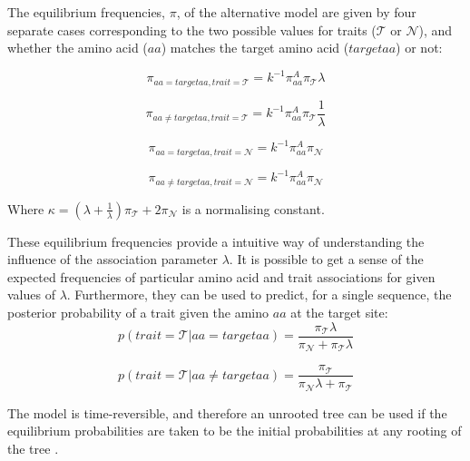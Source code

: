 \documentclass[]{article}
\begin{document}
The equilibrium frequencies, $\pi$, of the alternative model are given by four separate cases corresponding to the two possible values for traits ($\mathcal{T}$ or $\mathcal{N}$), and whether the amino acid ($aa$) matches the target amino acid ($targetaa$) or not:

\begin{equation}
\pi_{aa=targetaa,trait=\mathcal{T}}=k^{-1}\pi_{aa}^{A}\pi_{\mathcal{T}}\lambda
\end{equation}

\begin{equation}
\pi_{aa\neq targetaa,trait=\mathcal{T}}=k^{-1}\pi_{aa}^{A}\pi_{\mathcal{T}}\frac{1}{\lambda}
\end{equation}

\begin{equation}
\pi_{aa=targetaa,trait=\mathcal{N}}=k^{-1}\pi_{aa}^{A}\pi_{\mathcal{N}}
\end{equation}

\begin{equation}
\pi_{aa\neq targetaa,trait=\mathcal{N}}=k^{-1}\pi_{aa}^{A}\pi_{\mathcal{N}}
\end{equation}

Where $\kappa=(\lambda+\frac{1}{\lambda})\pi_{\mathcal{T}}+2\pi_{\mathcal{N}}$ is a normalising constant.

These equilibrium frequencies provide a intuitive way of understanding the influence of the association parameter $\lambda$. It is possible to get a sense of the expected frequencies of particular amino acid and trait associations for given values of $\lambda$. Furthermore, they can be used to predict, for a single sequence, the posterior probability of a trait given the amino $aa$ at the target site:
\begin{equation}
p(trait=\mathcal{T}|aa=targetaa)=\frac{\pi_{\mathcal{T}}\lambda}{\pi_{\mathcal{N}}+\pi_{\mathcal{T}}\lambda}
\end{equation}

\begin{equation}
p(trait=\mathcal{T}|aa\neq targetaa)=\frac{\pi_{\mathcal{T}}}{\pi_{\mathcal{N}}\lambda+\pi_{\mathcal{T}}}
\end{equation}

The model is time-reversible, and therefore an unrooted tree can be used if the equilibrium probabilities are taken to be the initial probabilities at any rooting of the tree \citep{felsenstein1981evolutionary}.
\end{document}
